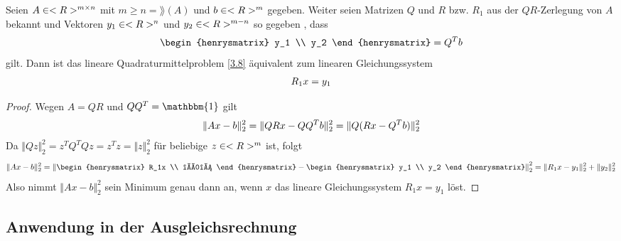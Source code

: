 \begin{proposition}
	Seien $A\in<R>^{m\times n}$ mit $m\ge n=\rang(A)$ und $b\in<R>^m$ gegeben. Weiter seien Matrizen $Q$ und $R$ bzw. $R_1$ aus der $QR$-Zerlegung von $A$ bekannt und Vektoren $y_1\in<R>^n$ und $y_2\in<R>^{m-n}$ so gegeben , dass
	\begin{align}
		\begin{henrysmatrix}
			y_1 \\ y_2
		\end{henrysmatrix} = Q ^Tb\notag
	\end{align}
	gilt. Dann ist das lineare Quadraturmittelproblem \cref{3.8} äquivalent zum linearen Gleichungssystem
	\begin{align}
		R_1x=y_1\notag
	\end{align}
\end{proposition}
\begin{proof}
	Wegen $A=QR$ und $QQ^T=\mathbbm{1}$ gilt
	\begin{align}
		\Vert Ax-b\Vert_2^2 = \Vert QRx-QQ^Tb\Vert_2^2 = \Vert Q(Rx-Q^Tb)\Vert_2^2\notag
	\end{align}
	Da $\Vert Qz\Vert_2^2 = z^TQ^TQz=z^Tz=\Vert z\Vert_2^2$ für beliebige $z\in<R>^m$ ist, folgt
	\begin{align}
		\Vert Ax-b\Vert_2^2 = \left\Vert \begin{henrysmatrix}
			R_1x \\ \mathbb{0}
		\end{henrysmatrix} - \begin{henrysmatrix}
			y_1 \\ y_2
		\end{henrysmatrix}\right\Vert_2^2 = \Vert R_1x-y_1\Vert_2^2 + \Vert y_2\Vert_2^2 \notag
	\end{align}
	Also nimmt $\Vert Ax-b\Vert_2^2$ sein Minimum genau dann an, wenn $x$ das lineare Gleichungssystem $R_1x=y_1$ löst.
\end{proof}

\subsection{Anwendung in der Ausgleichsrechnung}

